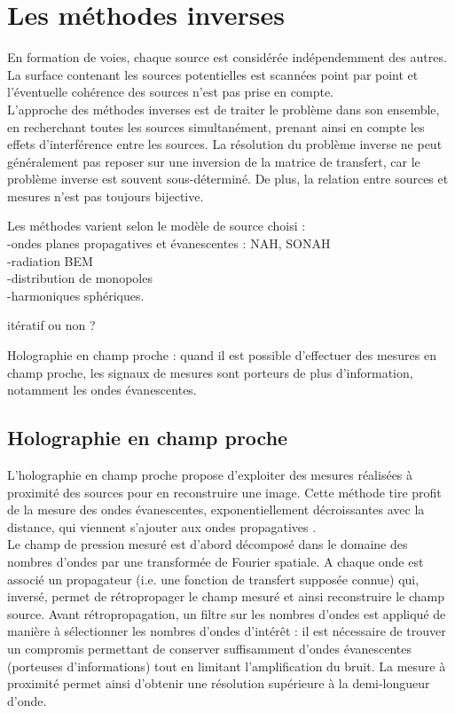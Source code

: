 \section{Les méthodes inverses}
En formation de voies, chaque source est considérée indépendemment des autres. La surface contenant les sources potentielles est scannées point par point et l'éventuelle cohérence des sources n'est pas prise en compte.\\

L'approche des méthodes inverses est de traiter le problème dans son ensemble, en recherchant toutes les sources simultanément, prenant ainsi en compte les effets d'interférence entre les sources.  La résolution du problème inverse ne peut généralement pas reposer sur une inversion de la matrice de transfert, car le problème inverse est souvent sous-déterminé. De plus, la relation entre sources et mesures n'est pas toujours bijective.

Les méthodes varient selon le modèle de source choisi : \\
-ondes planes propagatives et évanescentes : NAH, SONAH\\
-radiation BEM\\
-distribution de monopoles\\
-harmoniques sphériques.
 

itératif ou non ?

Holographie en champ proche : quand il est possible d'effectuer des mesures en champ proche, les signaux de mesures sont porteurs de plus d'information, notamment les ondes évanescentes.



\subsection{Holographie en champ proche}
L'holographie en champ proche propose d'exploiter des mesures réalisées à proximité des sources pour en reconstruire une image. Cette méthode tire profit de la mesure des ondes évanescentes, exponentiellement décroissantes avec la distance, qui viennent s'ajouter aux ondes propagatives \cite{Maynard1985}.\\
Le champ de pression mesuré est d'abord décomposé dans le domaine des nombres d'ondes par une transformée de Fourier spatiale. A chaque onde est associé un propagateur (i.e. une fonction de transfert supposée connue) qui, inversé, permet de rétropropager le champ mesuré et ainsi reconstruire le champ source.  Avant rétropropagation, un filtre sur les nombres d'ondes est appliqué de manière à sélectionner les nombres d'ondes d'intérêt : il est nécessaire de trouver un compromis permettant de conserver suffisamment d'ondes évanescentes (porteuses d'informations) tout en limitant l'amplification du bruit. La mesure à proximité permet ainsi d'obtenir une résolution supérieure à la demi-longueur d'onde.\\

